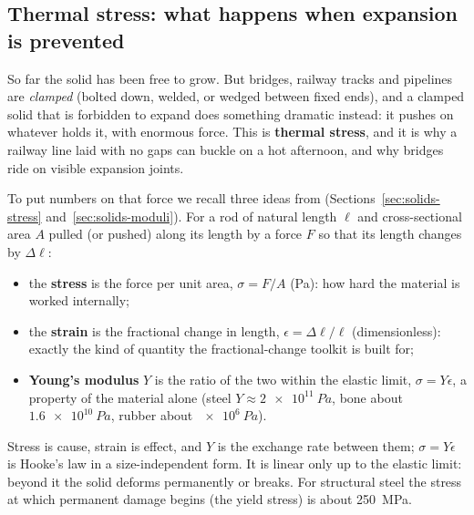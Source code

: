 \begin{figure}[htbp]
\centering
{}
\end{figure}


\subsection{Thermal stress: what happens when expansion is prevented}\label{sec:thermal-stress}

So far the solid has been free to grow. But bridges, railway tracks and pipelines are \emph{clamped}
(bolted down, welded, or wedged between fixed ends), and a clamped solid that is forbidden to expand
does something dramatic instead: it pushes on whatever holds it, with enormous force. This is
\textbf{thermal stress}, and it is why a railway line laid with no gaps can buckle on a hot afternoon,
and why bridges ride on visible expansion joints.

To put numbers on that force we recall three ideas from  (Sections~\ref{sec:solids-stress} and~\ref{sec:solids-moduli}). For a rod of natural length
$\ell$ and cross-sectional area $A$ pulled (or pushed) along its length by a force $F$ so that its
length changes by $\Delta\ell$:
\begin{itemize}
\item the \textbf{stress} is the force per unit area, $\sigma = F/A$ (\si{Pa}): how hard the material
      is worked internally;
\item the \textbf{strain} is the fractional change in length, $\epsilon = \Delta\ell/\ell$
      (dimensionless): exactly the kind of quantity the fractional-change toolkit is built for;
\item \textbf{Young's modulus} $Y$ is the ratio of the two within the elastic limit,
      $\sigma = Y\epsilon$, a property of the material alone (steel $Y\approx\SI{2e11}{Pa}$, bone about $\SI{1.6e10}{Pa}$, rubber about $\SI{e6}{Pa}$).
\end{itemize}
Stress is cause, strain is effect, and $Y$ is the exchange rate between them; $\sigma=Y\epsilon$ is
Hooke's law in a size-independent form. It is linear only up to the elastic limit: beyond it the solid
deforms permanently or breaks. For structural steel the stress at which permanent damage begins (the
yield stress) is about \SI{250}{MPa}.

